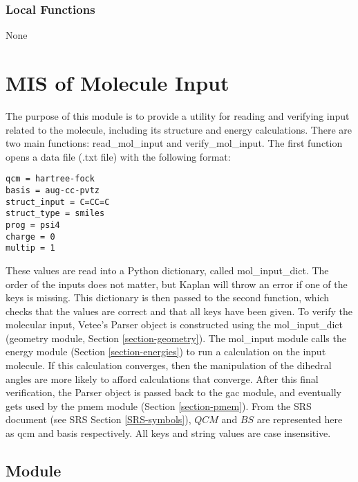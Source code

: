 \documentclass[12pt, titlepage]{article}
\newcommand{\progname}{Kaplan}
\begin{document}
\subsubsection{Local Functions}

None


\section{MIS of Molecule Input} \label{section-mol_input}

The purpose of this module is to provide a utility for reading and verifying 
input related to the molecule, including its structure and energy calculations. 
There are two main functions: read\_mol\_input and verify\_mol\_input. The 
first function opens a data file (.txt file) with the following format:

\begin{lstlisting}
qcm = hartree-fock
basis = aug-cc-pvtz
struct_input = C=CC=C
struct_type = smiles
prog = psi4
charge = 0
multip = 1
\end{lstlisting}

These values are read into a Python dictionary, called mol\_input\_dict. The 
order of the inputs does not matter, but \progname{} will throw an error if one 
of the keys is missing. This dictionary is then passed to the second function, 
which checks that the values are correct and that all keys have been given. To 
verify the molecular input, Vetee's Parser object is constructed using the 
mol\_input\_dict (geometry module, Section \ref{section-geometry}). The 
mol\_input module calls the energy module (Section \ref{section-energies}) to 
run a calculation on the input molecule. If this calculation converges, then 
the manipulation of the dihedral angles are more likely to afford calculations 
that converge. After this final verification, the Parser object is passed back 
to the gac module, and eventually gets used by the pmem module 
(Section \ref{section-pmem}). From the SRS document (see SRS Section 
\ref{SRS-symbols}), $QCM$ and $BS$ are represented here as qcm and basis 
respectively. All keys and string values are case insensitive.

\subsection{Module}
\end{document}
